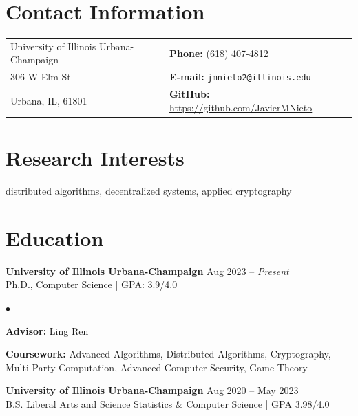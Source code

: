 \documentclass[margin,line]{res}
\newenvironment{list1}{
  \begin{list}{\ding{113}}{%
      \setlength{\itemsep}{0in}
      \setlength{\parsep}{0in} \setlength{\parskip}{0in}
      \setlength{\topsep}{0in} \setlength{\partopsep}{0in} 
      \setlength{\leftmargin}{0.17in}}}{\end{list}}
\newenvironment{list2}{
  \begin{list}{$\bullet$}{%
      \setlength{\itemsep}{0in}
      \setlength{\parsep}{0in} \setlength{\parskip}{0in}
      \setlength{\topsep}{0in} \setlength{\partopsep}{0in} 
      \setlength{\leftmargin}{0.2in}}}{\end{list}}
\begin{document}

\begin{resume}
  \section{\sc Contact Information}
  \vspace{.05in}
  \begin{tabular}{@{}p{3in}p{4in}}
    University of Illinois Urbana-Champaign & {\bf Phone:}   (618) 407-4812                       \\
    306 W Elm St                            & {\bf E-mail:}  {\tt jmnieto2@illinois.edu}          \\
    Urbana, IL, 61801                       & {\bf GitHub:} \url{https://github.com/JavierMNieto} \\
  \end{tabular}


  \section{\sc Research Interests}
  distributed algorithms, decentralized systems, applied cryptography

  \section{\sc Education}
   {\bf University of Illinois Urbana-Champaign} \hfill Aug 2023 -- \emph{Present}\\
  Ph.D., Computer Science | GPA: 3.9/4.0
  \begin{list2}
    \item {\bf \small Advisor:}  Ling Ren
    \item {\bf \small Coursework:} Advanced Algorithms, Distributed Algorithms, Cryptography, Multi-Party Computation, Advanced Computer Security, Game Theory
  \end{list2}

  {\bf University of Illinois Urbana-Champaign} \hfill Aug 2020 -- May 2023\\
  B.S. Liberal Arts and Science Statistics \& Computer Science | GPA 3.98/4.0


\end{resume}
\end{document}

